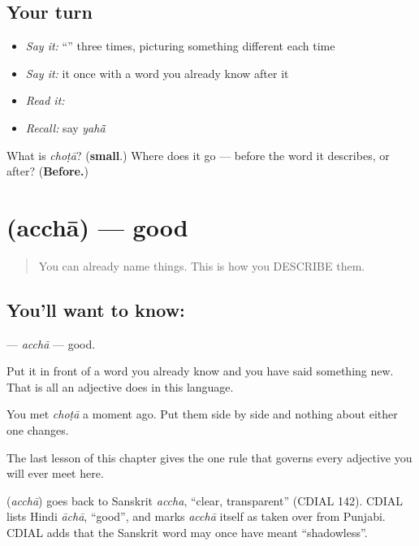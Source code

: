 \subsection*{Your turn}
\begin{itemize}
\raggedright
  \item \emph{Say it:} \textquotedblleft{}\textquotedblright{} three times, picturing something different each time
  \item \emph{Say it:} it once with a word you already know after it
  \item \emph{Read it:} \textbf{}
  \item \emph{Recall:} say \emph{yahā̃}
\end{itemize}

\begin{tcolorbox}[breakable,colback=teal!4,colframe=teal!35!black,title={Before you move on}]
What is \emph{choṭā}? (\textbf{small}.) Where does it go — before the word it describes, or after? (\textbf{Before.})
\end{tcolorbox}
\section[\texorpdfstring{\hi{अच्छा} (acchā)}{अच्छा (acchā)}]{ (acchā) — good}

\label{lesson:HI-C41-good}



\begin{quote}
You can already name things. This is how you DESCRIBE them.
\end{quote}

\subsection*{You'll want to know: }
\textbf{} — \emph{acchā} — good.

Put it in front of a word you already know and you have said something new. That is all an adjective does in this language.

You met \textbf{} \emph{choṭā} a moment ago. Put them side by side and nothing about either one changes.

The last lesson of this chapter gives the one rule that governs every adjective you will ever meet here.

\begin{cousinweb}
\textbf{} (\emph{acchā}) goes back to Sanskrit \emph{accha}, \textquotedblleft{}clear, transparent\textquotedblright{} (CDIAL 142). CDIAL lists Hindi \emph{āchā}, \textquotedblleft{}good\textquotedblright{}, and marks \emph{acchā} itself as taken over from Punjabi. CDIAL adds that the Sanskrit word may once have meant \textquotedblleft{}shadowless\textquotedblright{}.
\end{cousinweb}

